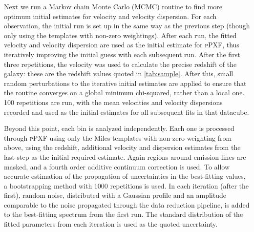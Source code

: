 



		Next we run a Markov chain Monte Carlo (MCMC) routine to find more optimum initial estimates for velocity and velocity dispersion. For each observation, the initial run is set up in the same way as the previous step (though only using the templates with non-zero weightings). After each run, the fitted velocity and velocity dispersion are used as the initial estimate for \textsc{pPXF}, thus iteratively improving the initial guess with each subsequent run. After the first three repetitions, the velocity was used to calculate the precise redshift of the galaxy: these are the redshift values quoted in \ref{tab:sample}. After this, small random perturbations to the iterative initial estimates are applied to ensure that the routine converges on a global minimum chi-squared, rather than a local one. 100 repetitions are run, with the mean velocities and velocity dispersions recorded and used as the initial estimates for all subsequent fits in that datacube. 

		Beyond this point, each bin is analyzed independently. Each one is processed through \textsc{pPXF} using only the Miles templates with non-zero weighting from above, using the redshift, additional velocity and dispersion estimates from the last step as the initial required estimate. Again regions around emission lines are masked, and a fourth order additive continuum correction is used. To allow accurate estimation of the propagation of uncertainties in the best-fitting values, a bootstrapping method with 1000 repetitions is used. In each iteration (after the first), random noise, distributed with a Gaussian profile and an amplitude comparable to the noise propagated through the data reduction pipeline, is added to the best-fitting spectrum from the first run. The standard distribution of the fitted parameters from each iteration is used as the quoted uncertainty.


